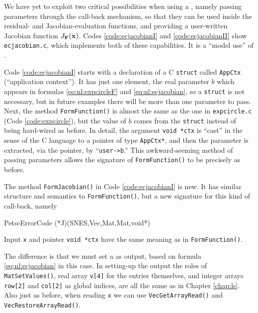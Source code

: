 We have yet to exploit two critical possibilities when using a \pSNES, namely passing parameters through the call-back mechanism, so that they can be used inside the residual- and Jacobian-evaluation functions, and providing a user-written Jacobian function $J_{\mathbf{F}}(\mathbf{x})$.  Codes \ref{code:ecjacobianI} and \ref{code:ecjacobianII} show  \texttt{ecjacobian.c}, which implements both of these capabilities.  It is a ``model use'' of \pSNES.

Code \ref{code:ecjacobianI} starts with a declaration of a C \texttt{struct} called \texttt{AppCtx} (``application context'').  It has just one element, the real parameter $b$ which appears in formulas \eqref{eq:nl:expcircleF} and \eqref{eq:nl:ecjacobian}, so a \texttt{struct} is not necessary, but in future examples there will be more than one parameter to pass.  Next, the method \texttt{FormFunction()} is almost the same as the one in \texttt{expcircle.c} (Code \ref{code:expcircle}), but the value of $b$ comes from the \texttt{struct} instead of being hard-wired as before.  In detail, the argument \texttt{void *ctx} is ``cast'' in the sense of the C language \citep{KernighanRitchie1988} to a pointer of type \texttt{AppCtx*}, and then the parameter is extracted, via the pointer, by ``\texttt{user->b}.''  This awkward-seeming method of passing parameters allows the signature of \texttt{FormFunction()} to be precisely as before.

The method \texttt{FormJacobian()} in Code \ref{code:ecjacobianI} is new.  It has similar structure and semantics to \texttt{FormFunction()}, but a new signature for this kind of call-back, namely
\begin{code}
PetscErrorCode (*J)(SNES,Vec,Mat,Mat,void*)
\end{code}
Input \pVec \texttt{x} and pointer \texttt{void *ctx} have the same meaning as in \texttt{FormFunction()}.

The difference is that we must set a \pMat as output, based on formula \eqref{eq:nl:ecjacobian} in this case.  In setting-up the output \pMat the roles of \texttt{MatSetValues()}, real array \texttt{v[4]} for the entries themselves, and integer arrays \texttt{row[2]} and \texttt{col[2]} as global indices, are all the same as in Chapter \ref{chap:ls}.  Also just as before, when reading \texttt{x} we can use \texttt{VecGetArrayRead()} and \texttt{VecRestoreArrayRead()}.

